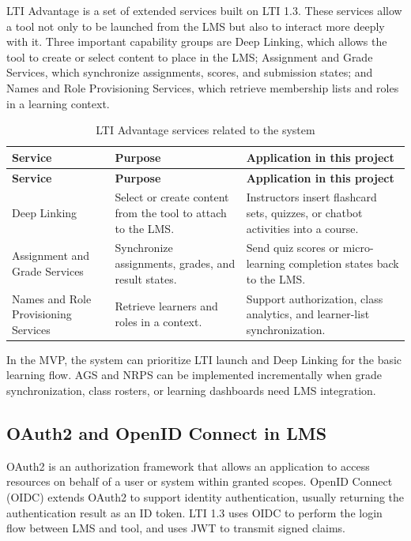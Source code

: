 LTI Advantage is a set of extended services built on LTI 1.3. These
services allow a tool not only to be launched from the LMS but also to
interact more deeply with it. Three important capability groups are Deep
Linking, which allows the tool to create or select content to place in
the LMS; Assignment and Grade Services, which synchronize assignments,
scores, and submission states; and Names and Role Provisioning Services,
which retrieve membership lists and roles in a learning context.

\begin{longtable}{|p{3.5cm}|p{4.2cm}|p{6.3cm}|}
\caption{LTI Advantage services related to the system}
\label{tab:lti-advantage-services}\\
\hline
\textbf{Service} & \textbf{Purpose} & \textbf{Application in this project} \\
\hline
\endfirsthead
\hline
\textbf{Service} & \textbf{Purpose} & \textbf{Application in this project} \\
\hline
\endhead
Deep Linking & Select or create content from the tool to attach to the LMS. & Instructors insert flashcard sets, quizzes, or chatbot activities into a course. \\
\hline
Assignment and Grade Services & Synchronize assignments, grades, and result states. & Send quiz scores or micro-learning completion states back to the LMS. \\
\hline
Names and Role Provisioning Services & Retrieve learners and roles in a context. & Support authorization, class analytics, and learner-list synchronization. \\
\hline
\end{longtable}

In the MVP, the system can prioritize LTI launch and Deep Linking for the
basic learning flow. AGS and NRPS can be implemented incrementally when
grade synchronization, class rosters, or learning dashboards need LMS
integration.

\subsection{OAuth2 and OpenID Connect in LMS}
\label{subsec:oauth2-oidc-lms}

OAuth2 is an authorization framework that allows an application to access
resources on behalf of a user or system within granted scopes. OpenID
Connect (OIDC) extends OAuth2 to support identity authentication, usually
returning the authentication result as an ID token. LTI 1.3 uses OIDC to
perform the login flow between LMS and tool, and uses JWT to transmit
signed claims.

